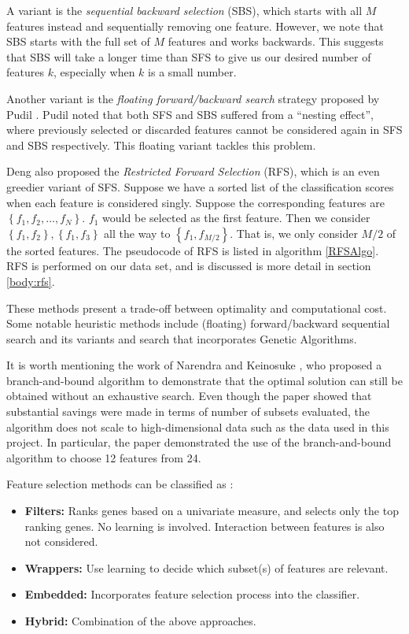 \documentclass[12pt, twoside, a4paper]{article}
\begin{document}
A variant is the \textit{sequential backward selection} (SBS), which starts with all $M$ features instead and sequentially removing one feature. However, we note that SBS starts with the full set of $M$ features and works backwards. This suggests that SBS will take a longer time than SFS to give us our desired number of features $k$, especially when $k$ is a small number.

Another variant is the \textit{floating forward/backward search} strategy proposed by Pudil \cite{RefWorks:178}. Pudil noted that both SFS and SBS suffered from a ``nesting effect'', where previously selected or discarded features cannot be considered again in SFS and SBS respectively. This floating variant tackles this problem.

Deng \cite{deng1998omega} also proposed the \textit{Restricted Forward Selection} (RFS), which is an even greedier variant of SFS. Suppose we have a sorted list of the classification scores when each feature is considered singly. Suppose the corresponding features are $\left\lbrace f_1, f_2, \dots , f_N \right\rbrace$. $f_1$ would be selected as the first feature. Then we consider $\left\lbrace f_1, f_2 \right\rbrace, \left\lbrace f_1, f_3 \right\rbrace$ all the way to $\left\lbrace f_1, f_{M/2} \right\rbrace$. That is, we only consider $M/2$ of the sorted features. The pseudocode of RFS is listed in algorithm \ref{RFSAlgo}. RFS is performed on our data set, and is discussed is more detail in section \ref{body:rfs}.


These methods present a trade-off between optimality and computational cost. Some notable heuristic methods include (floating) forward/backward sequential search and its variants and search that incorporates Genetic Algorithms.

It is worth mentioning the work of Narendra and Keinosuke \cite{RefWorks:176}, who proposed a branch-and-bound algorithm to demonstrate that the optimal solution can still be obtained without an exhaustive search. Even though the paper showed that substantial savings were made in terms of number of subsets evaluated, the algorithm does not scale to high-dimensional data \cite{RefWorks:178} such as the data used in this project. In particular, the paper demonstrated the use of the branch-and-bound algorithm to choose 12 features from 24.


Feature selection methods can be classified as \cite{RefWorks:117, RefWorks:118}:
\begin{itemize}
\item \textbf{Filters:} Ranks genes based on a univariate measure, and selects only the top ranking genes. No learning is involved. Interaction between features is also not considered.
\item \textbf{Wrappers:} Use learning to decide which subset(s) of features are relevant.
\item \textbf{Embedded:} Incorporates feature selection process into the classifier.
\item \textbf{Hybrid:} Combination of the above approaches.
\end{itemize}
\end{document}
